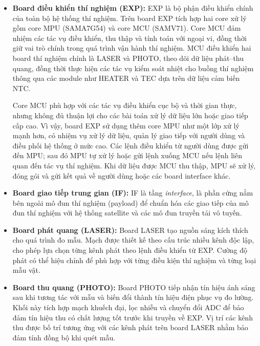 \begin{itemize}
    \item \textbf{Board điều khiển thí nghiệm (EXP):}
    EXP là bộ phận điều khiển chính của toàn bộ hệ thống thí nghiệm. Trên board EXP tích hợp hai core xử lý gồm core MPU (SAMA7G54) và core MCU (SAMV71). Core MCU đảm nhiệm các tác vụ điều khiển, thu thập và tính toán với ngoại vi, đồng thời giữ vai trò chính trong quá trình vận hành thí nghiệm. MCU điều khiển hai board thí nghiệm chính là LASER và PHOTO, theo dõi dữ liệu phát--thu quang, đồng thời thực hiện các tác vụ kiểm soát nhiệt cho buồng thí nghiệm thông qua các module như HEATER và TEC dựa trên dữ liệu cảm biến NTC.

    Core MCU phù hợp với các tác vụ điều khiển cục bộ và thời gian thực, nhưng không đủ thuận lợi cho các bài toán xử lý dữ liệu lớn hoặc giao tiếp cấp cao. Vì vậy, board EXP sử dụng thêm core MPU như một lớp xử lý mạnh hơn, có nhiệm vụ xử lý dữ liệu, quản lý giao tiếp với người dùng và điều phối hệ thống ở mức cao. Các lệnh điều khiển từ người dùng được gửi đến MPU; sau đó MPU tự xử lý hoặc gửi lệnh xuống MCU nếu lệnh liên quan đến tác vụ thí nghiệm. Khi dữ liệu được MCU thu thập, MPU sẽ xử lý, đóng gói và gửi kết quả về người dùng hoặc các board interface khác.

    \item \textbf{Board giao tiếp trung gian (IF):}
    IF là tầng \textit{interface}, là phần cứng nằm bên ngoài mô đun thí nghiệm (payload) để chuẩn hóa các giao tiếp của mô đun thí nghiệm với hệ thống satellite và các mô đun truyền tải vô tuyến.

    \item \textbf{Board phát quang (LASER):}
    Board LASER tạo nguồn sáng kích thích cho quá trình đo mẫu. Mạch được thiết kế theo cấu trúc nhiều kênh độc lập, cho phép lựa chọn từng kênh phát theo lệnh điều khiển từ EXP. Cường độ phát có thể hiệu chỉnh để phù hợp với từng điều kiện thí nghiệm và từng loại mẫu vật.

    \item \textbf{Board thu quang (PHOTO):}
    Board PHOTO tiếp nhận tín hiệu ánh sáng sau khi tương tác với mẫu và biến đổi thành tín hiệu điện phục vụ đo lường. Khối này tích hợp mạch khuếch đại, lọc nhiễu và chuyển đổi ADC để bảo đảm tín hiệu thu có chất lượng tốt trước khi truyền về EXP. Vị trí các kênh thu được bố trí tương ứng với các kênh phát trên board LASER nhằm bảo đảm tính đồng bộ khi quét mẫu.
\end{itemize}


